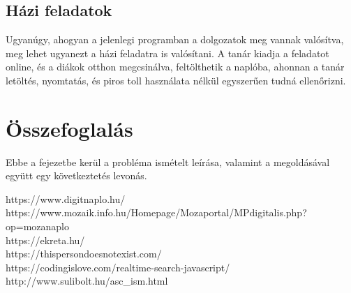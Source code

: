 \documentclass[
]{thesis-ekf}
\begin{document}
\section{Házi feladatok}
Ugyanúgy, ahogyan a jelenlegi programban a dolgozatok meg vannak valósítva, meg lehet ugyanezt a házi feladatra is valósítani. A  tanár kiadja a feladatot online, és a diákok otthon megcsinálva, feltölthetik a naplóba, ahonnan a tanár letöltés, nyomtatás, és piros toll használata nélkül egyszerűen tudná ellenőrizni. 
\chapter{Összefoglalás}
Ebbe a fejezetbe kerül a probléma ismételt leírása, valamint a megoldásával együtt egy következtetés levonás.
\begin{thebibliography}{}
	https://www.digitnaplo.hu/\\
	https://www.mozaik.info.hu/Homepage/Mozaportal/MPdigitalis.php?op=mozanaplo\\
	https://ekreta.hu/\\
	https://thispersondoesnotexist.com/ \\
	https://codingislove.com/realtime-search-javascript/\\
	http://www.sulibolt.hu/asc\_ism.html
\end{thebibliography}
\end{document}
